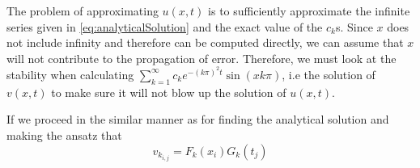 \documentclass[12pt,english,a4paper]{article}
\begin{document}
The problem of approximating \(u(x,t)\) is to sufficiently approximate the infinite series given in \vref{eq:analyticalSolution} and the exact value of the \(c_k\)s. Since \( x\) does not include infinity and therefore can be computed directly, we can assume that \(x\) will not contribute to the propagation of error. Therefore, we must look at the stability when calculating \( \sum_{k=1}^\infty c_ke^{-(k\pi)^2t}\sin(xk\pi) \), i.e the solution of \(v(x,t)\) to make sure it will not blow up the solution of \(u(x,t)\).

If we proceed in the similar manner as for finding the analytical solution and making the ansatz that
\begin{equation}\label{eq:discreteAnsatz}
v_{k_{i,j}} = F_k(x_i)G_k(t_j)
\end{equation}
\end{document}
